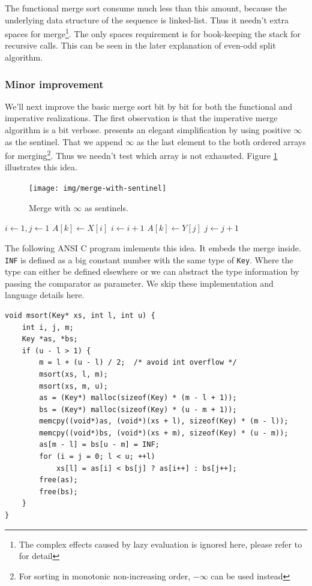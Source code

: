 \documentclass[b5paper]{article}
\begin{document}
The functional merge sort consume much less than this amount, because the underlying data structure
of the sequence is linked-list. Thus it needn't extra spaces for merge\footnote{The complex effects
caused by lazy evaluation is ignored here, please refer to \cite{algo-fp} for detail}.
The only spaces requirement is for book-keeping the stack for recursive calls. This can be
seen in the later explanation of even-odd split algorithm.

\subsubsection{Minor improvement}
We'll next improve the basic merge sort bit by bit for both the functional and imperative realizations.
The first observation is that the imperative merge algorithm is a bit verbose. \cite{CLRS} presents
an elegant simplification by using positive $\infty$ as the sentinel. That we append $\infty$ as
the last element to the both ordered arrays for merging\footnote{For sorting in monotonic non-increasing order,
$-\infty$ can be used instead}. Thus we needn't test which array is not exhausted. Figure \ref{fig:merge-with-sentinel}
illustrates this idea.

\begin{figure}[htbp]
 \centering
 \texttt{[image: img/merge-with-sentinel]}
 \caption{Merge with $\infty$ as sentinels.}
 \label{fig:merge-with-sentinel}
\end{figure}

\begin{algorithmic}[1]
  \State {}
  \State {}
  \State $i \gets 1, j\gets 1$
      \State $A[k] \gets X[i]$
      \State $i \gets i + 1$
    \Else
      \State $A[k] \gets Y[j]$
      \State $j \gets j + 1$
    \EndIf
  \EndFor
\EndProcedure
\end{algorithmic}

The following ANSI C program imlements this idea. It embeds the merge inside. \texttt{INF} is defined
as a big constant number with the same type of \texttt{Key}. Where the type can either be defined elsewhere
or we can abstract the type information by passing the comparator as parameter. We skip these
implementation and language details here.

\lstset{language=C}
\begin{lstlisting}
void msort(Key* xs, int l, int u) {
    int i, j, m;
    Key *as, *bs;
    if (u - l > 1) {
        m = l + (u - l) / 2;  /* avoid int overflow */
        msort(xs, l, m);
        msort(xs, m, u);
        as = (Key*) malloc(sizeof(Key) * (m - l + 1));
        bs = (Key*) malloc(sizeof(Key) * (u - m + 1));
        memcpy((void*)as, (void*)(xs + l), sizeof(Key) * (m - l));
        memcpy((void*)bs, (void*)(xs + m), sizeof(Key) * (u - m));
        as[m - l] = bs[u - m] = INF;
        for (i = j = 0; l < u; ++l)
            xs[l] = as[i] < bs[j] ? as[i++] : bs[j++];
        free(as);
        free(bs);
    }
}
\end{lstlisting}
\end{document}

